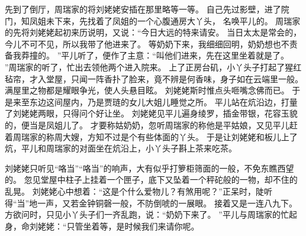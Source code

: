 \par
先到了倒厅，周瑞家的将刘姥姥安插在那里略等一等。
自己先过影壁，进了院门，知凤姐未下来，先找着了凤姐的一个心腹通房大丫头，
名唤平儿的。
周瑞家的先将刘姥姥起初来历说明，又说：“今日大远的特来请安。
当日太太是常会的，今儿不可不见，所以我带了他进来了。
等奶奶下来，我细细回明，奶奶想也不责备我莽撞的。
”平儿听了，便作了主意：“叫他们进来，先在这里坐着就是了。
”周瑞家的听了，忙出去领他两个进入院来。
上了正房台矶，小丫头子打起了猩红毡帘，才入堂屋，只闻一阵香扑了脸来，竟不辨是何香味，身子如在云端里一般。
满屋里之物都是耀眼争光，使人头悬目眩。
刘姥姥斯时惟点头咂嘴念佛而已。
于是来至东边这间屋内，乃是贾琏的女儿大姐儿睡觉之所。
平儿站在炕沿边，打量了刘姥姥两眼，只得问个好让坐。
刘姥姥见平儿遍身绫罗，插金带银，花容玉貌的，便当是凤姐儿了。
才要称姑奶奶，忽听周瑞家的称他是平姑娘，又见平儿赶着周瑞家的称周大嫂，方知不过是个有些体面的丫头。
于是让刘姥姥和板儿上了炕，平儿和周瑞家的对面坐在炕沿上，小丫头子斟上茶来吃茶。
\par
刘姥姥只听见“咯当”“咯当”的响声，大有似乎打箩柜筛面的一般，不免东瞧西望的。
忽见堂屋中柱子上挂着一个匣子，底下又坠着一个秤砣般的一物，却不住的乱晃。
刘姥姥心中想着：“这是个什么爱物儿？有煞用呢？”正呆时，陡听得“当”地一声，又若金钟铜磬一般，不防倒唬的一展眼。
接着又是一连八九下。
方欲问时，只见小丫头子们一齐乱跑，说：“奶奶下来了。
”平儿与周瑞家的忙起身，命刘姥姥：“只管坐着等，是时候我们来请你呢。
